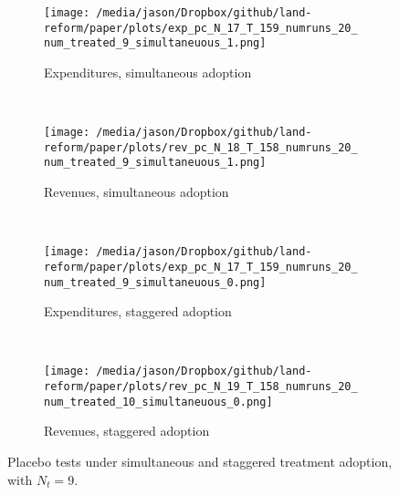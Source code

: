 \begin{figure}[htbp]
	\centering
	\begin{subfigure}[t]{0.48\textwidth}
		\centering
		\texttt{[image: /media/jason/Dropbox/github/land-reform/paper/plots/exp\_pc\_N\_17\_T\_159\_numruns\_20\_num\_treated\_9\_simultaneuous\_1.png]}
		\caption{Expenditures, simultaneous adoption}
	\end{subfigure}
	~ 
	\begin{subfigure}[t]{0.48\textwidth}
		\centering
		\texttt{[image: /media/jason/Dropbox/github/land-reform/paper/plots/rev\_pc\_N\_18\_T\_158\_numruns\_20\_num\_treated\_9\_simultaneuous\_1.png]}
		\caption{Revenues, simultaneous adoption}
	\end{subfigure}
	~ 
	\begin{subfigure}[t]{0.48\textwidth}
		\centering
		\texttt{[image: /media/jason/Dropbox/github/land-reform/paper/plots/exp\_pc\_N\_17\_T\_159\_numruns\_20\_num\_treated\_9\_simultaneuous\_0.png]}
		\caption{Expenditures, staggered adoption}
	\end{subfigure}
	~ 
	\begin{subfigure}[t]{0.48\textwidth}
		\centering
		\texttt{[image: /media/jason/Dropbox/github/land-reform/paper/plots/rev\_pc\_N\_19\_T\_158\_numruns\_20\_num\_treated\_10\_simultaneuous\_0.png]}
		\caption{Revenues, staggered adoption}
	\end{subfigure}
	\caption{Placebo tests under simultaneous and staggered treatment adoption, with $N_t = 9$. \label{mc-sim}} 
\end{figure}
